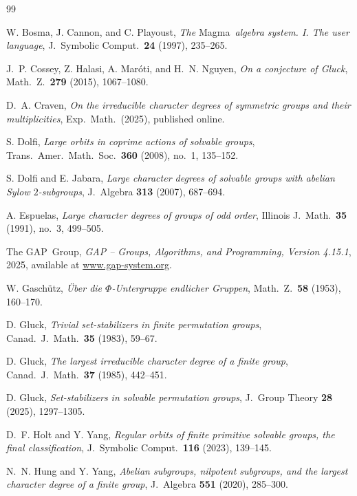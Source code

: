 \documentclass[10pt]{amsart}
\theoremstyle{definition}
\newcommand{\GAP}{\textsf{GAP}}
\newcommand{\Magma}{\textsf{Magma}}
\numberwithin{equation}{section}
\numberwithin{table}{section}
\begin{document}
\begin{thebibliography}{99}

W. Bosma, J. Cannon, and C. Playoust,
{\it The} \Magma\ {\it algebra system. I. The user language},
J.\ Symbolic Comput.\ \textbf{24} (1997), 235--265.

J.~P. Cossey, Z. Halasi, A. Mar\'oti, and H.~N. Nguyen,
{\it On a conjecture of Gluck},
Math.\ Z.\ \textbf{279} (2015), 1067--1080.

D.~A. Craven,
{\it On the irreducible character degrees of symmetric groups and their
multiplicities},
Exp.\ Math.\ (2025), published online.

S. Dolfi,
{\it Large orbits in coprime actions of solvable groups},
Trans.\ Amer.\ Math.\ Soc.\ \textbf{360} (2008), no.~1, 135--152.

S. Dolfi and E. Jabara,
{\it Large character degrees of solvable groups with abelian Sylow
$2$-subgroups},
J.\ Algebra \textbf{313} (2007), 687--694.

A. Espuelas,
{\it Large character degrees of groups of odd order},
Illinois J.\ Math.\ \textbf{35} (1991), no.~3, 499--505.

The \GAP~Group,
{\it \textup{\GAP} -- Groups, Algorithms, and Programming, Version 4.15.1},
2025, available at
\href{https://www.gap-system.org}{www.gap-system.org}.

W. Gasch\"utz,
{\it \"Uber die $\Phi$-Untergruppe endlicher Gruppen},
Math.\ Z.\ \textbf{58} (1953), 160--170.

D. Gluck,
{\it Trivial set-stabilizers in finite permutation groups},
Canad.\ J.\ Math.\ \textbf{35} (1983), 59--67.

D. Gluck,
{\it The largest irreducible character degree of a finite group},
Canad.\ J.\ Math.\ \textbf{37} (1985), 442--451.

D. Gluck,
{\it Set-stabilizers in solvable permutation groups},
J.\ Group Theory \textbf{28} (2025), 1297--1305.

D.~F. Holt and Y. Yang,
{\it Regular orbits of finite primitive solvable groups, the final
classification},
J.\ Symbolic Comput.\ \textbf{116} (2023), 139--145.

N.~N. Hung and Y. Yang,
{\it Abelian subgroups, nilpotent subgroups, and the largest character
degree of a finite group},
J.\ Algebra \textbf{551} (2020), 285--300.


\end{thebibliography}
\end{document}
